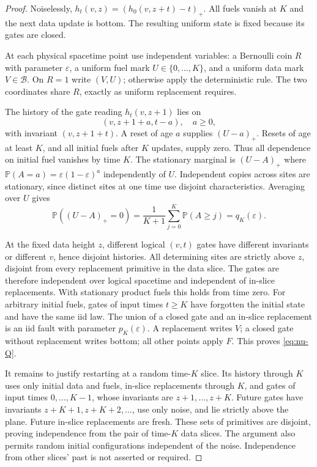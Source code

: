 \documentclass[11pt]{article}
\theoremstyle{plain}
\theoremstyle{definition}
\theoremstyle{remark}
\newcommand{\Prob}{\mathbb P}
\newcommand{\eps}{\varepsilon}
\begin{document}
\begin{proof}
Noiselessly, $h_t(v,z)=(h_0(v,z+t)-t)_+$. All fuels vanish at $K$ and the next data update is bottom. The resulting uniform state is fixed because its gates are closed.

At each physical spacetime point use independent variables: a Bernoulli coin $R$ with parameter $\eps$, a uniform fuel mark $U\in\{0,\ldots,K\}$, and a uniform data mark $V\in\mathcal B$. On $R=1$ write $(V,U)$; otherwise apply the deterministic rule. The two coordinates share $R$, exactly as uniform replacement requires.

The history of the gate reading $h_t(v,z+1)$ lies on
\[
 (v,z+1+a,t-a),\quad a\ge0,
\]
with invariant $(v,z+1+t)$. A reset of age $a$ supplies $(U-a)_+$. Resets of age at least $K$, and all initial fuels after $K$ updates, supply zero. Thus all dependence on initial fuel vanishes by time $K$. The stationary marginal is $(U-A)_+$ where $\Prob(A=a)=\eps(1-\eps)^a$ independently of $U$. Independent copies across sites are stationary, since distinct sites at one time use disjoint characteristics. Averaging over $U$ gives
\[
 \Prob((U-A)_+=0)
 =\frac1{K+1}\sum_{j=0}^K\Prob(A\ge j)=q_K(\eps).
\]

At the fixed data height $z$, different logical $(v,t)$ gates have different invariants or different $v$, hence disjoint histories. All determining sites are strictly above $z$, disjoint from every replacement primitive in the data slice. The gates are therefore independent over logical spacetime and independent of in-slice replacements. With stationary product fuels this holds from time zero. For arbitrary initial fuels, gates of input times $t\ge K$ have forgotten the initial state and have the same iid law. The union of a closed gate and an in-slice replacement is an iid fault with parameter $p_K(\eps)$. A replacement writes $V$; a closed gate without replacement writes bottom; all other points apply $F$. This proves \eqref{eq:nu-Q}.

It remains to justify restarting at a random time-$K$ slice. Its history through $K$ uses only initial data and fuels, in-slice replacements through $K$, and gates of input times $0,\ldots,K-1$, whose invariants are $z+1,\ldots,z+K$. Future gates have invariants $z+K+1,z+K+2,\ldots$, use only noise, and lie strictly above the plane. Future in-slice replacements are fresh. These sets of primitives are disjoint, proving independence from the pair of time-$K$ data slices. The argument also permits random initial configurations independent of the noise. Independence from other slices' past is not asserted or required.
\end{proof}
\end{document}
